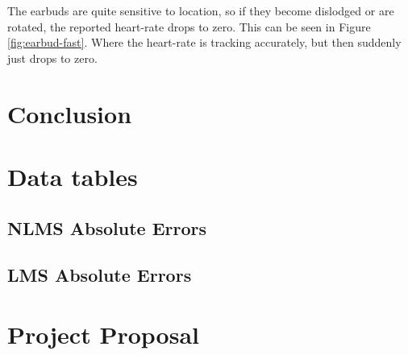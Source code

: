 \documentclass[12pt,a4paper,twoside,openright]{report}
\begin{document}
The earbuds are quite sensitive to location, so if they become dislodged or
are rotated, the reported heart-rate drops to zero. This can be seen in Figure
\ref{fig:earbud-fast}. Where the heart-rate is tracking accurately, but then
suddenly just drops to zero.

\chapter{Conclusion}




\appendix

\chapter{Data tables}
\section{NLMS Absolute Errors} \label{section:nlms-errors}


\section{LMS Absolute Errors} \label{section:lms-errors}


\chapter{Project Proposal}


\end{document}
